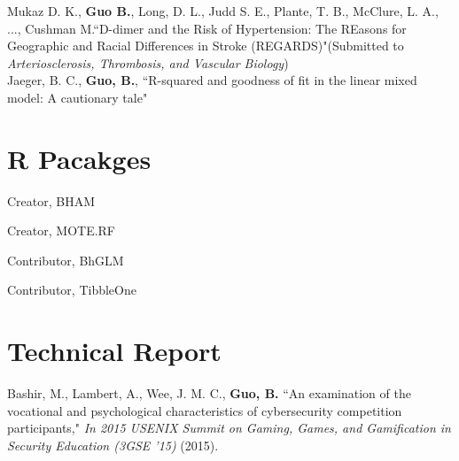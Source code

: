 Mukaz D. K., \textbf{Guo B.}, Long, D. L., Judd S. E., Plante, T. B., McClure, L. A., ...,  Cushman M.``D-dimer and the Risk of Hypertension: The REasons for Geographic and Racial Differences in Stroke (REGARDS)"(Submitted to \textit{Arteriosclerosis, Thrombosis, and Vascular Biology})\\

Jaeger, B. C., \textbf{Guo, B.}, ``R-squared and goodness of fit in the linear mixed model: A cautionary tale"


\section{R Pacakges}
\begin{lonelist}
    \item Creator, BHAM
	\item Creator, MOTE.RF
	\item Contributor, BhGLM
	\item Contributor, TibbleOne
\end{lonelist}



\section{Technical Report}
Bashir, M., Lambert, A., Wee, J. M. C., \textbf{Guo, B.}  ``An examination of the vocational and psychological characteristics of cybersecurity competition participants," \textit{In 2015 USENIX Summit on Gaming, Games, and Gamification in Security Education (3GSE '15)} (2015).